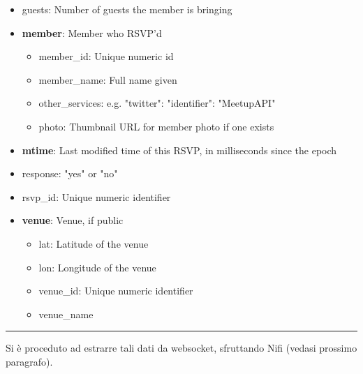 \documentclass[fleqn,10pt]{SelfArx} %
\begin{document}
{\begin{itemize}[noitemsep]
\begin{itemize}[noitemsep]
\begin{itemize}[noitemsep]
			\end{itemize}
    \item group\_urlname: Unique portion of group's URL, no slashes
	\end{itemize}
\item guests: Number of guests the member is bringing
\item \textbf{member}: Member who RSVP'd
	\begin{itemize}[noitemsep]
    \item member\_id: Unique numeric id
    \item member\_name: Full name given
    \item other\_services: e.g. {"twitter": {"identifier": "MeetupAPI"}}
    \item photo: Thumbnail URL for member photo if one exists
	\end{itemize}
\item \textbf{mtime}: Last modified time of this RSVP, in milliseconds since the epoch
\item response: "yes" or "no"
\item rsvp\_id: Unique numeric identifier
\item \textbf{venue}: Venue, if public
	\begin{itemize}[noitemsep]
    \item lat: Latitude of the venue
    \item lon: Longitude of the venue
    \item venue\_id: Unique numeric identifier
    \item venue\_name
	\end{itemize}    
\end{itemize}
\hrule
\vspace*{0.2cm}
Si è proceduto ad estrarre tali dati da websocket, sfruttando Nifi (vedasi prossimo paragrafo).
}
\end{document}
